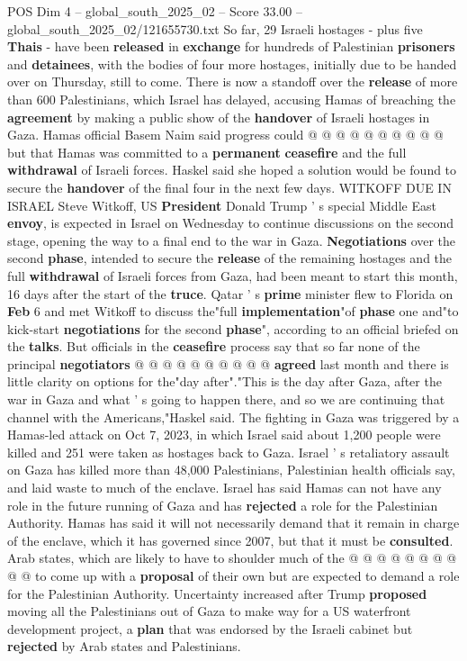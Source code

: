 \begin{textsample}{POS Dim 4 – global\_south\_2025\_02 – Score 33.00 – global\_south\_2025\_02/121655730.txt}
So far, 29 Israeli hostages - plus five \textbf{Thais} - have been \textbf{released} in \textbf{exchange} for hundreds of Palestinian \textbf{prisoners} and \textbf{detainees}, with the bodies of four more hostages, initially due to be handed over on Thursday, still to come.
There is now a standoff over the \textbf{release} of more than 600 Palestinians, which Israel has delayed, accusing Hamas of breaching the \textbf{agreement} by making a public show of the \textbf{handover} of Israeli hostages in Gaza.
Hamas official Basem Naim said progress could @ @ @ @ @ @ @ @ @ @ but that Hamas was committed to a \textbf{permanent} \textbf{ceasefire} and the full \textbf{withdrawal} of Israeli forces.
Haskel said she hoped a solution would be found to secure the \textbf{handover} of the final four in the next few days.
WITKOFF DUE IN ISRAEL Steve Witkoff, US \textbf{President} Donald Trump ' s special Middle East \textbf{envoy}, is expected in Israel on Wednesday to continue discussions on the second stage, opening the way to a final end to the war in Gaza. \textbf{Negotiations} over the second \textbf{phase}, intended to secure the \textbf{release} of the remaining hostages and the full \textbf{withdrawal} of Israeli forces from Gaza, had been meant to start this month, 16 days after the start of the \textbf{truce}.
Qatar ' s \textbf{prime} minister flew to Florida on \textbf{Feb} 6 and met Witkoff to discuss the"full \textbf{implementation}"of \textbf{phase} one and"to kick-start \textbf{negotiations} for the second \textbf{phase}", according to an official briefed on the \textbf{talks}.
But officials in the \textbf{ceasefire} process say that so far none of the principal \textbf{negotiators} @ @ @ @ @ @ @ @ @ @ \textbf{agreed} last month and there is little clarity on options for the"day after"."This is the day after Gaza, after the war in Gaza and what ' s going to happen there, and so we are continuing that channel with the Americans,"Haskel said.
The fighting in Gaza was triggered by a Hamas-led attack on Oct 7, 2023, in which Israel said about 1,200 people were killed and 251 were taken as hostages back to Gaza.
Israel ' s retaliatory assault on Gaza has killed more than 48,000 Palestinians, Palestinian health officials say, and laid waste to much of the enclave.
Israel has said Hamas can not have any role in the future running of Gaza and has \textbf{rejected} a role for the Palestinian Authority.
Hamas has said it will not necessarily demand that it remain in charge of the enclave, which it has governed since 2007, but that it must be \textbf{consulted}.
Arab states, which are likely to have to shoulder much of the @ @ @ @ @ @ @ @ @ @ to come up with a \textbf{proposal} of their own but are expected to demand a role for the Palestinian Authority.
Uncertainty increased after Trump \textbf{proposed} moving all the Palestinians out of Gaza to make way for a US waterfront development project, a \textbf{plan} that was endorsed by the Israeli cabinet but \textbf{rejected} by Arab states and Palestinians.


\end{textsample}
